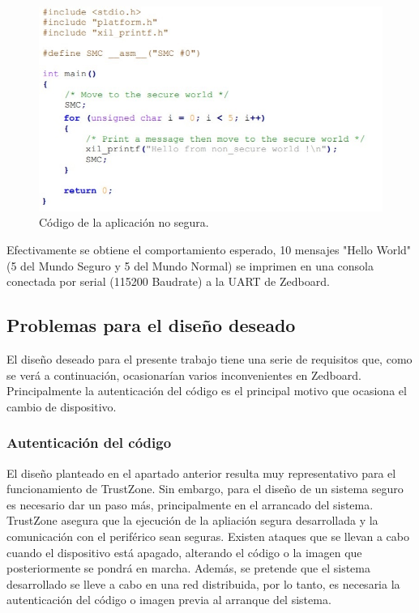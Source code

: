 \begin{figure}
	\centering
	\includegraphics[width=1\textwidth]{imagenes/normalapp.jpg}
	\caption{\label{fig1}Código de la aplicación no segura.}
\end{figure}

Efectivamente se obtiene el comportamiento esperado, 10 mensajes "Hello World" (5 del Mundo Seguro y 5 del Mundo Normal) se imprimen en una consola conectada por serial (115200 Baudrate) a la UART de Zedboard.

\subsection{Problemas para el diseño deseado}

El diseño deseado para el presente trabajo tiene una serie de requisitos que, como se verá a continuación, ocasionarían varios inconvenientes en Zedboard. Principalmente la autenticación del código es el principal motivo que ocasiona el cambio de dispositivo. \newline

\subsubsection{Autenticación del código}
El diseño planteado en el apartado anterior resulta muy representativo para el funcionamiento de TrustZone. Sin embargo, para el diseño de un sistema seguro es necesario dar un paso más, principalmente en el arrancado del sistema. TrustZone asegura que la ejecución de la apliación segura desarrollada y la comunicación con el periférico sean seguras. Existen ataques que se llevan a cabo cuando el dispositivo está apagado, alterando el código o la imagen que posteriormente se pondrá en marcha. Además, se pretende que el sistema desarrollado se lleve a cabo en una red distribuida, por lo tanto, es necesaria la autenticación del código o imagen previa al arranque del sistema. \newline


